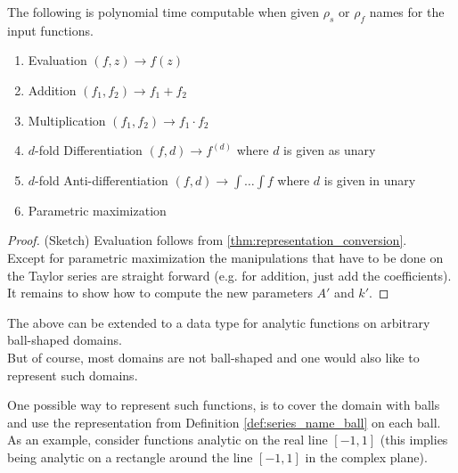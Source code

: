 	 \begin{theorem}\label{thm:polytime_on_ball}
	 	The following is polynomial time computable when given $\rho_s$ or $\rho_f$ names for the input functions.
	 	\begin{enumerate}
	 		\item Evaluation $(f,z) \to f(z)$
	 		\item Addition $(f_1, f_2) \to f_1 + f_2$
	 		\item Multiplication $(f_1, f_2) \to f_1 \cdot f_2$
	 		\item $d$-fold Differentiation $(f,d) \to f^{(d)}$ where $d$ is given as unary
	 		\item $d$-fold Anti-differentiation $(f,d) \to \int \dots \int f$ where $d$ is given in unary
	 		\item Parametric maximization
	 	\end{enumerate}
	 	\begin{proof}(Sketch)
	 		Evaluation follows from \ref{thm:representation_conversion}. \\
	 		Except for parametric maximization the manipulations that have to be done on the Taylor series are straight forward (e.g. for addition, just add the coefficients).
	 		It remains to show how to compute the new parameters $A'$ and $k'$. 
	 	\end{proof}
	 \end{theorem}

	The above can be extended to a data type for analytic functions on arbitrary ball-shaped domains.\\
	But of course, most domains are not ball-shaped and one would also like to represent such domains.
	
	One possible way to represent such functions, is to cover the domain with balls and use the representation from Definition \ref{def:series_name_ball} on each ball.
	As an example, consider functions analytic on the real line $[-1,1]$ (this implies being analytic on a rectangle around the line $[-1,1]$ in the complex plane).
	

